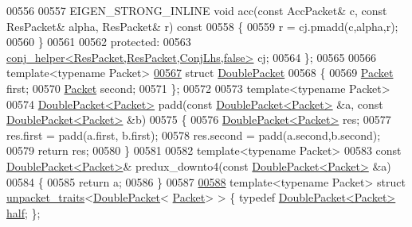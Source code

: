 \begin{DoxyCode}
00556 
00557   EIGEN\_STRONG\_INLINE \textcolor{keywordtype}{void} acc(\textcolor{keyword}{const} AccPacket& c, \textcolor{keyword}{const} ResPacket& alpha, ResPacket& r)\textcolor{keyword}{ const}
00558 \textcolor{keyword}{  }\{
00559     r = cj.pmadd(c,alpha,r);
00560   \}
00561 
00562 \textcolor{keyword}{protected}:
00563   \hyperlink{struct_eigen_1_1internal_1_1conj__helper}{conj\_helper<ResPacket,ResPacket,ConjLhs,false>} cj;
00564 \};
00565 
00566 \textcolor{keyword}{template}<\textcolor{keyword}{typename} Packet>
\hyperlink{struct_eigen_1_1internal_1_1_double_packet}{00567} \textcolor{keyword}{struct }\hyperlink{struct_eigen_1_1internal_1_1_double_packet}{DoublePacket}
00568 \{
00569   \hyperlink{union_eigen_1_1internal_1_1_packet}{Packet} first;
00570   \hyperlink{union_eigen_1_1internal_1_1_packet}{Packet} second;
00571 \};
00572 
00573 \textcolor{keyword}{template}<\textcolor{keyword}{typename} Packet>
00574 \hyperlink{struct_eigen_1_1internal_1_1_double_packet}{DoublePacket<Packet>} padd(\textcolor{keyword}{const} \hyperlink{struct_eigen_1_1internal_1_1_double_packet}{DoublePacket<Packet>} &a, \textcolor{keyword}{const} 
      \hyperlink{struct_eigen_1_1internal_1_1_double_packet}{DoublePacket<Packet>} &b)
00575 \{
00576   \hyperlink{struct_eigen_1_1internal_1_1_double_packet}{DoublePacket<Packet>} res;
00577   res.first  = padd(a.first, b.first);
00578   res.second = padd(a.second,b.second);
00579   \textcolor{keywordflow}{return} res;
00580 \}
00581 
00582 \textcolor{keyword}{template}<\textcolor{keyword}{typename} Packet>
00583 \textcolor{keyword}{const} \hyperlink{struct_eigen_1_1internal_1_1_double_packet}{DoublePacket<Packet>}& predux\_downto4(\textcolor{keyword}{const} 
      \hyperlink{struct_eigen_1_1internal_1_1_double_packet}{DoublePacket<Packet>} &a)
00584 \{
00585   \textcolor{keywordflow}{return} a;
00586 \}
00587 
\hyperlink{struct_eigen_1_1internal_1_1unpacket__traits_3_01_double_packet_3_01_packet_01_4_01_4}{00588} \textcolor{keyword}{template}<\textcolor{keyword}{typename} Packet> \textcolor{keyword}{struct }\hyperlink{struct_eigen_1_1internal_1_1unpacket__traits}{unpacket\_traits}<\hyperlink{struct_eigen_1_1internal_1_1_double_packet}{DoublePacket}<
      \hyperlink{union_eigen_1_1internal_1_1_packet}{Packet}> > \{ \textcolor{keyword}{typedef} \hyperlink{struct_eigen_1_1internal_1_1_double_packet}{DoublePacket<Packet>} \hyperlink{struct_eigen_1_1internal_1_1_double_packet}{half}; \};

\end{DoxyCode}
